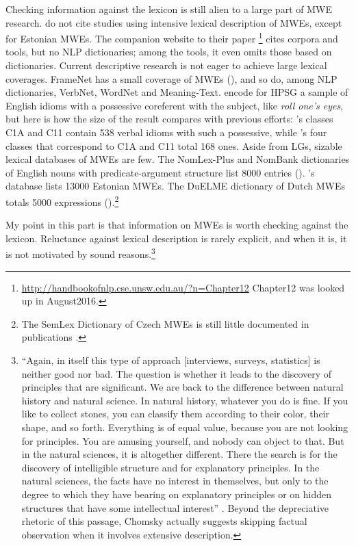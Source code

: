 \documentclass[output=paper]{langsci/langscibook}
\begin{document}
Checking information against the lexicon is still alien to a large part of MWE research. \citet{Baldwin2010} do not cite studies using intensive lexical description of MWEs, except for Estonian MWEs. The companion website to their paper \footnote{\url{http://handbookofnlp.cse.unsw.edu.au/?n=Chapter12} Chapter12 was looked up in August2016.} cites corpora and tools, but no NLP dictionaries; among the tools, it even omits those based on dictionaries. Current descriptive research is not eager to achieve large lexical coverages. FrameNet has a small coverage of MWEs (\citealt{Hartmann2013}), and so do, among NLP dictionaries, VerbNet, WordNet and Meaning-Text. \cite{Bond}  encode for HPSG a sample of English idioms with a possessive coreferent with the subject, like \textit{roll one’s eyes}, but here is how the size of the result compares with previous efforts: \cite{Freckleton1985}'s classes C1A and C11 contain 538 verbal idioms with such a possessive, while \cite[64]{Bond}’s  four classes that correspond to C1A and C11 total 168 ones. Aside from LGs, sizable lexical databases of MWEs are few. The NomLex-Plus and NomBank dictionaries of English nouns with predicate-argument structure list 8000 entries (\citealt{Meyers2007}). \cite{Kaalep2008}'s database lists 13000 Estonian MWEs. The DuELME dictionary of Dutch MWEs totals 5000 expressions (\citealt{Gregoire2010}).\footnote{ The SemLex Dictionary of Czech MWEs is still little documented in publications \citep{Bejcek2010}.}

My point in this part is that information on MWEs is worth checking against the lexicon. Reluctance against lexical description is rarely explicit, and when it is, it is not motivated by sound reasons.\footnote{ “Again, in itself this type of approach [interviews, surveys, statistics] is neither good nor bad. The question is whether it leads to the discovery of principles that are significant. We are back to the difference between natural history and natural science. In natural history, whatever you do is fine. If you like to collect stones, you can classify them according to their color, their shape, and so forth. Everything is of equal value, because you are not looking for principles. You are amusing yourself, and nobody can object to that. But in the natural sciences, it is altogether different. There the search is for the discovery of intelligible structure and for explanatory principles. In the natural sciences, the facts have no interest in themselves, but only to the degree to which they have bearing on explanatory principles or on hidden structures that have some intellectual interest” \citep[58-59]{Chomsky1979}. Beyond the depreciative rhetoric of this passage, Chomsky actually suggests skipping factual observation when it involves extensive description.}
\end{document}
